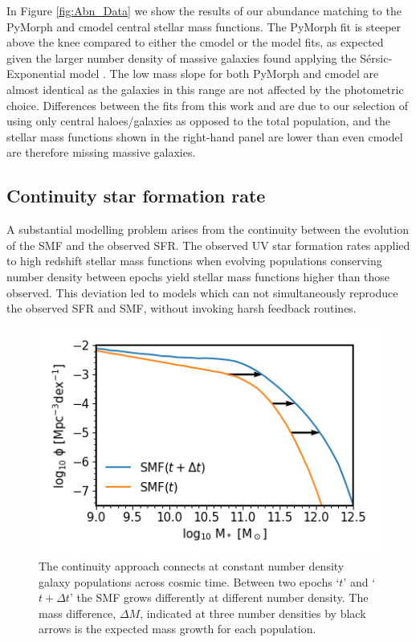 In Figure \ref{fig:Abn_Data} we show the results of our abundance matching to the PyMorph and cmodel central stellar mass functions. The PyMorph fit is steeper above the knee compared to either the cmodel or the \citet{Moster2013} model fits, as expected given the larger number density of massive galaxies found applying the S\'ersic-Exponential model \citep[eg.,][]{Shankar2014, Kravtsov2018StellarHalos}. The low mass slope for both PyMorph and cmodel are almost identical as the galaxies in this range are not affected by the photometric choice. Differences between the fits from this work and \citet{Moster2013} are due to our selection of using only central haloes/galaxies as opposed to the total population, and the stellar mass functions shown in the right-hand panel are lower than even cmodel are therefore missing massive galaxies.


\subsection{Continuity star formation rate}

A substantial modelling problem arises from the continuity between the evolution of the SMF and the observed SFR. The observed UV star formation rates applied to high redshift stellar mass functions when evolving populations conserving number density between epochs yield stellar mass functions higher than those observed. This deviation led to models which can not simultaneously reproduce the observed SFR and SMF, without invoking harsh feedback routines.

\begin{figure}[h]
    \centering
    \includegraphics[width = \linewidth]{Figures/Chapter2/ContinuityEqn.png}
    \caption{The continuity approach connects at constant number density galaxy populations across cosmic time. Between two epochs `$t$' and `$t + \Delta t$' the SMF grows differently at different number density. The mass difference, $\Delta M$, indicated at three number densities by black arrows is the expected mass growth for each population.}
    \label{fig:Cont_Eqn}
\end{figure}

